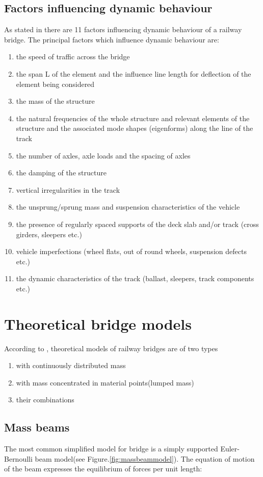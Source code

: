 \subsection{Factors influencing dynamic behaviour}
As stated in\cite[6.4.2]{EC12} there are 11 factors influencing dynamic behaviour of a railway bridge. The principal factors which influence dynamic behaviour are:
\begin{enumerate}[-]
	\item the speed of traffic across the bridge
	\item the span L of the element and the influence line length for deflection of the element being considered
	\item the mass of the structure
	\item the natural frequencies of the whole structure and relevant elements of the structure and the associated mode shapes (eigenforms) along the line of the track
	\item the number of axles, axle loads and the spacing of axles
	\item the damping of the structure
	\item vertical irregularities in the track
	\item the unsprung/sprung mass and suspension characteristics of the vehicle
	\item the presence of regularly spaced supports of the deck slab and/or track (cross girders, sleepers etc.)
	\item vehicle imperfections (wheel flats, out of round wheels, suspension defects etc.)
	\item the dynamic characteristics of the track (ballast, sleepers, track components etc.)
\end{enumerate}

\section{Theoretical bridge models}
According to \cite[Chapter.2]{fryba1996dynamics}, theoretical models of railway bridges are of two types

\begin{enumerate}[-]
	\item with continuously distributed mass
	\item with mass concentrated in material points(lumped mass)
	\item their combinations
\end{enumerate}

\subsection{Mass beams}
The most common simplified model for bridge is a simply supported Euler-Bernoulli beam model(see Figure.\ref{fig:massbeammodel}). The equation of motion of the beam expresses the equilibrium of forces per unit length:

